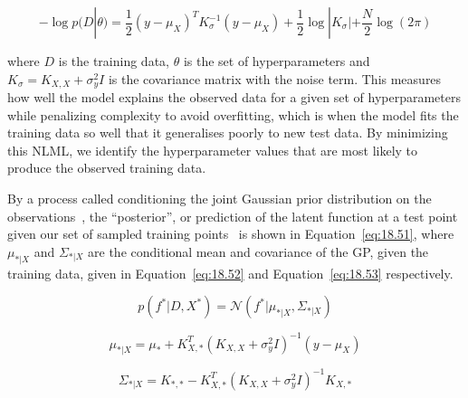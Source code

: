 \documentclass[12pt]{article}
\begin{document}
    \begin{equation}
        -\log p(D|\theta) = \frac{1}{2} (y - \mu_X)^T K_{\sigma}^{-1} (y - \mu_X) + \frac{1}{2} \log |K_{\sigma}| + \frac{N}{2} \log(2\pi)\label{eq:NLML}
    \end{equation}


    where $D$ is the training data, $\theta$ is the set of hyperparameters and $K_{\sigma} = K_{X,X} + \sigma^2_y I$ is the covariance matrix with the noise term.
    This measures how well the model explains the observed data for a given set of hyperparameters while penalizing complexity to avoid overfitting, which is when the model fits the training data so well that it generalises poorly to new test data.
    By minimizing this NLML, we identify the hyperparameter values that are most likely to produce the observed training data.

    By a process called conditioning the joint Gaussian prior distribution on the observations~\cite{rasmussen2006gaussian}, the ``posterior'', or prediction of the latent function at a test point given our set of sampled training points~\cite{murphy2023probabilistic} is shown in Equation~\ref{eq:18.51}, where $\mu_{*|X}$ and $\Sigma_{*|X}$ are the conditional mean and covariance of the GP, given the training data, given in Equation~\ref{eq:18.52} and Equation~\ref{eq:18.53} respectively.

    \begin{equation}
        p(f^* | D, X^*) = \mathcal{N}(f^* | \mu_{*|X}, \Sigma_{*|X})\label{eq:18.51}
    \end{equation}

    \begin{equation}
        \mu_{*|X} = \mu_* + K_{X,*}^T (K_{X,X} + \sigma^2_y I)^{-1} (y - \mu_X)\label{eq:18.52}
    \end{equation}

    \begin{equation}
        \Sigma_{*|X} = K_{*,*} - K_{X,*}^T (K_{X,X} + \sigma^2_y I)^{-1} K_{X,*}\label{eq:18.53}
    \end{equation}

\end{document}
